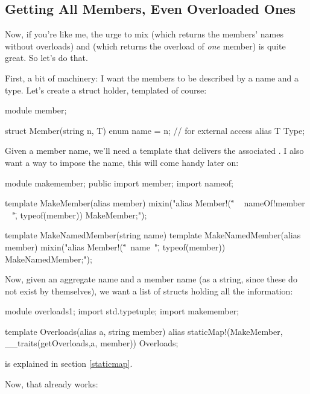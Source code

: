 \subsection{Getting All Members, Even Overloaded Ones}

Now, if you're like me, the urge to mix  (which returns the members' names without overloads) and   (which returns the overload of \emph{one} member) is quite great. So let's do that.

First, a bit of machinery: I want the members to be described by a name and a type. Let's create a struct holder, templated of course:


\begin{dcode}
module member;

struct Member(string n, T)
{
    enum name = n; // for external access
    alias T Type;
}
\end{dcode}

Given a member name, we'll need a template that delivers the associated . I also want a way to impose the name, this will come handy later on:

\begin{dcode}
module makemember;
public import member;
import nameof;

template MakeMember(alias member)
{
    mixin("alias Member!(\"" ~ nameOf!member ~ "\", typeof(member)) MakeMember;");
}

template MakeNamedMember(string name)
{
    template MakeNamedMember(alias member)
    {
        mixin("alias Member!(\""~name~"\", typeof(member)) MakeNamedMember;");
    }
}
\end{dcode}

Now, given an aggregate name and a member name (as a string, since these do not exist by themselves), we want a list of  structs holding all the information:

\begin{dcode}
module overloads1;
import std.typetuple;
import makemember;

template Overloads(alias a, string member)
{
    alias staticMap!(MakeMember, __traits(getOverloads,a, member))
          Overloads;
}
\end{dcode}

 is explained in section \ref{staticmap}.

Now, that already works:

